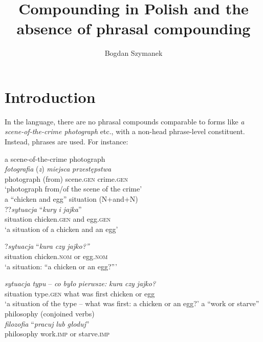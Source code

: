 \documentclass[output=paper]{LSP/langsci}
\author{Bogdan Szymanek\affiliation{John Paul II Catholic University
    of Lublin}
}
\title{Compounding in Polish and the absence of phrasal compounding}
\begin{document}
  
\section{Introduction}\label{sec:szymanek:1}

In the  language, there are no phrasal compounds comparable to  forms like \textit{a scene-of-the-crime photograph} etc., with a non-head phrase-level constituent. Instead, phrases are used. For instance:


\ea%
    \label{ex:szymanek:1} 
\ea 
a scene-of-the-crime photograph\\
\gll \textit{fotografia} (\textit{z}) \textit{miejsca} \textit{przestępstwa}\\
photograph (from) scene.\textsc{gen} crime.\textsc{gen} \\
\glt ‘photograph from/of the scene of the crime’ \\
\newpage
\ex 
 a “chicken and egg” situation (N+and+N)  \citep[44]{Trips2014}\\
 \ea   
 \gll ??\textit{sytuacja} “\textit{kury} \textit{i} \textit{jajka}”\\
situation chicken.\textsc{gen} and egg.\textsc{gen}\\
\glt ‘a situation of a chicken and an egg’

 \ex 
 \gll ?\textit{sytuacja} “\textit{kura} \textit{czy} \textit{jajko?”}\\
 situation chicken.\textsc{nom} or egg.\textsc{nom}\\
\glt    ‘a situation: “a chicken or an egg?”’

 \ex \textit{sytuacja} \textit{typu} – \textit{co} \textit{było} \textit{pierwsze:} \textit{kura} \textit{czy} \textit{jajko?}\\
situation type.\textsc{gen} what was first     chicken or egg\\
\glt    ‘a situation of the type – what was first: a chicken or an egg?’
  \z
  \ex 
  a “work or starve” philosophy   (conjoined verbs)  \citep[44]{Trips2014}\\
\gll  \textit{filozofia} “\textit{pracuj} \textit{lub} \textit{głoduj}”\\
philosophy work.\textsc{imp} or starve.\textsc{imp}\\
\z
\z 
\end{document}
